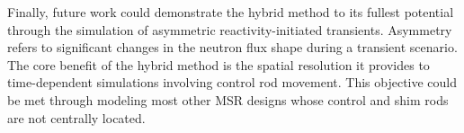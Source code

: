Finally, future work could demonstrate the hybrid method to its fullest potential through the
simulation of asymmetric reactivity-initiated transients. Asymmetry refers to significant changes
in the neutron flux shape during a transient scenario. The core benefit of the hybrid method is
the spatial resolution it provides to time-dependent simulations involving control rod movement.
This objective could be met through modeling most other \gls{MSR} designs whose control and shim
rods are not centrally located.
